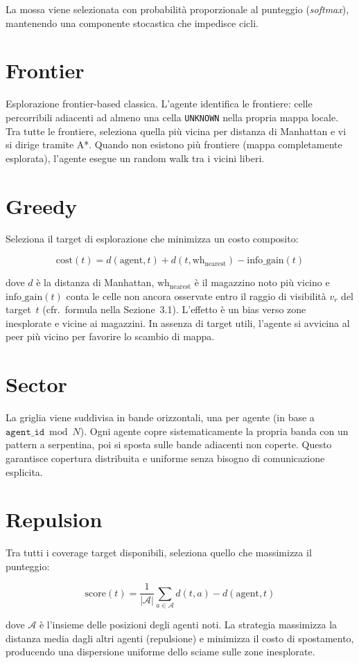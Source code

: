 La mossa viene selezionata con probabilit\`a proporzionale al punteggio (\textit{softmax}),
mantenendo una componente stocastica che impedisce cicli.

\section{Frontier}

Esplorazione frontier-based classica. L'agente identifica le frontiere: celle percorribili
adiacenti ad almeno una cella \texttt{UNKNOWN} nella propria mappa locale. Tra tutte le
frontiere, seleziona quella pi\`u vicina per distanza di Manhattan e vi si dirige tramite A*.
Quando non esistono pi\`u frontiere (mappa completamente esplorata), l'agente esegue un
random walk tra i vicini liberi.

\section{Greedy}

Seleziona il target di esplorazione che minimizza un costo composito:

$$\text{cost}(t) = d(\text{agent}, t) + d(t, \text{wh}_{\text{nearest}}) - \text{info\_gain}(t)$$

dove $d$ \`e la distanza di Manhattan, $\text{wh}_{\text{nearest}}$ \`e il magazzino noto
pi\`u vicino e $\text{info\_gain}(t)$ conta le celle non ancora osservate entro il raggio
di visibilit\`a $v_r$ del target~$t$ (cfr.\ formula nella Sezione~3.1).
L'effetto \`e un bias verso zone inesplorate
e vicine ai magazzini. In assenza di target utili, l'agente si avvicina al peer pi\`u
vicino per favorire lo scambio di mappa.

\section{Sector}

La griglia viene suddivisa in bande orizzontali, una per agente (in base a
$\texttt{agent\_id} \bmod N$). Ogni agente copre sistematicamente la propria banda con
un pattern a serpentina, poi si sposta sulle bande adiacenti non coperte. Questo garantisce
copertura distribuita e uniforme senza bisogno di comunicazione esplicita.

\section{Repulsion}

Tra tutti i coverage target disponibili, seleziona quello che massimizza il punteggio:

$$\text{score}(t) = \frac{1}{|\mathcal{A}|}\sum_{a \in \mathcal{A}} d(t, a) - d(\text{agent}, t)$$

dove $\mathcal{A}$ \`e l'insieme delle posizioni degli agenti noti. La strategia massimizza
la distanza media dagli altri agenti (repulsione) e minimizza il costo di spostamento,
producendo una dispersione uniforme dello sciame sulle zone inesplorate.


